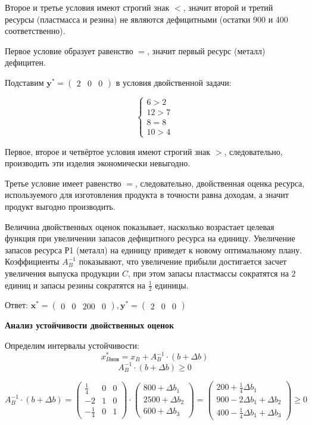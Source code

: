 \documentclass{article}
\begin{document}
Второе и третье условия имеют строгий знак $<$, значит второй и третий ресурсы (пластмасса и резина) не являются дефицитными (остатки 900 и 400 соответственно).

Первое условие образует равенство $=$, значит первый ресурс (металл) дефицитен.

Подставим $ \mathbf{y^*} = \begin{pmatrix} 2 & 0 & 0 \end{pmatrix}$ в условия двойственной задачи:

\[
    \begin{cases}
        6 > 2  \\
        12 > 7 \\
        8 = 8  \\
        10 > 4
    \end{cases}
\]

Первое, второе и четвёртое условия имеют строгий знак $>$, следовательно, производить эти изделия экономически невыгодно.

Третье условие имеет равенство $=$, следовательно, двойственная оценка ресурса, используемого для изготовления продукта в точности равна доходам, а значит продукт выгодно производить.

Величина двойственных оценок показывает, насколько возрастает целевая функция при увеличении запасов дефицитного ресурса на единицу.
Увеличение запасов ресурса Р1 (металл) на единицу приведет к новому оптимальному плану.
Коэффициенты $A_B^{-1}$ показывают, что увеличение прибыли достигается засчет увеличения выпуска продукции $C$, при этом запасы пластмассы сократятся на $2$ единиц и запасы резины сократятся на $\frac{1}{2}$ единицы.


Ответ: $\mathbf{x^*} = \begin{pmatrix} 0 & 0 & 200 & 0 \end{pmatrix}, \mathbf{y^*} = \begin{pmatrix} 2 & 0 & 0 \end{pmatrix}$


\textbf{Анализ устойчивости двойственных оценок}

Определим интервалы устойчивости:
\[x^*_{B\text{нов}} = x_B + A_B^{-1} \cdot (b + \Delta b)\]
\[ A_B^{-1} \cdot (b + \Delta b) \geq 0 \]

\[
    A_B^{-1} \cdot (b + \Delta b) = \begin{pmatrix}
        \frac{1}{4}  & 0 & 0 \\
        -2           & 1 & 0 \\
        -\frac{1}{4} & 0 & 1
    \end{pmatrix} \cdot \begin{pmatrix}
        800 + \Delta b_1  \\
        2500 + \Delta b_2 \\
        600 + \Delta b_3
    \end{pmatrix} = \begin{pmatrix}
        200 + \frac{1}{4} \Delta b_1    \\
        900 - 2 \Delta b_1 + \Delta b_2 \\
        400 - \frac{1}{4} \Delta b_1 + \Delta b_3
    \end{pmatrix} \geq 0
\]
\end{document}
